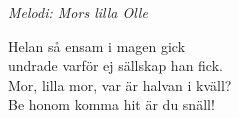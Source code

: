 {\footnotesize\textit{Melodi: Mors lilla Olle}}\par
\vspace{10pt}
Helan så ensam i magen gick\\
undrade varför ej sällskap han fick.\\
Mor, lilla mor, var är halvan i kväll?\\
Be honom komma hit är du snäll!
